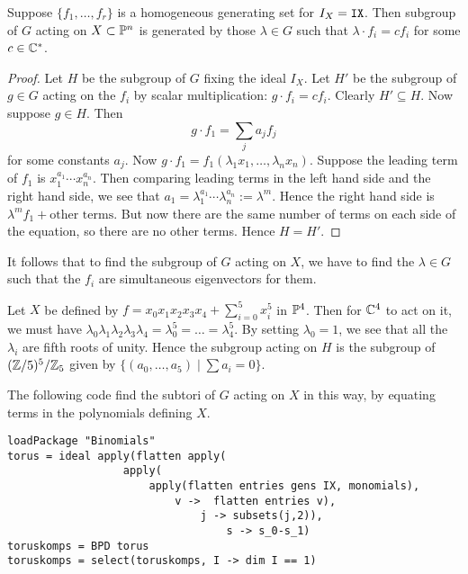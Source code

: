 \begin{lemma}
Suppose $\{ f_1,\ldots, f_r \}$ is a homogeneous generating set for $I_X=\text{\texttt{IX}}$. Then subgroup of $G$ acting on $X \subset \P^n$ is generated by those $\lambda \in G$ such that $\lambda \cdot f_i  = c f_i$ for some $c \in \C^\ast$.
\end{lemma}
\begin{proof}
Let $H$ be the subgroup of $G$ fixing the ideal $I_X$. Let $H'$ be the subgroup of $g \in G$ acting on the $f_i$ by scalar multiplication: $g \cdot f_i =c f_i$. Clearly $H' \subseteq H$.  Now suppose $g \in H$. Then
$$
g \cdot f_1 = \sum_j a_j f_j
$$
for some constants $a_j$. Now $g \cdot f_1 = f_1(\lambda_1 x _1 ,\ldots, \lambda_n x_n)$. Suppose the leading term of $f_1$ is $x_1^{a_1}\cdots x_n^{a_n}$. Then comparing leading terms in the left hand side and the right hand side, we see that $a_1 = \lambda_1^{a_1}\cdots \lambda_n^{a_n} := \lambda^m$. Hence the right hand side is $\lambda^m f_1 + \text{other terms}$. But now there are the same number of terms on each side of the equation, so there are no other terms. Hence $H=H'$. 
\end{proof}

It follows that to find the subgroup of $G$ acting on $X$, we have to find the $\lambda \in G$ such that the $f_i$ are simultaneous eigenvectors for them.

\begin{example}
\label{example:torus}
Let  $X$ be defined by $f = x_0x_1x_2x_3x_4+\sum_{i=0}^5 x_i^5$ in $\P^4$. Then for $\C^4$ to act on it, we must have $\lambda_0\lambda_1\lambda_2\lambda_3\lambda_4=\lambda_0^5=\ldots=\lambda_4^5$. By setting $\lambda_0=1$, we see that all the $\lambda_i$ are fifth roots of unity. Hence the subgroup acting on $H$ is the subgroup of $(\Z/5)^5/\Z_5$ given by $\{ (a_0,\ldots,a_5) \mid \sum a_i = 0 \}$.
\end{example}

The following code find the subtori of $G$ acting on $X$ in this way, by equating terms in the polynomials defining $X$.

\begin{lstlisting}[language=Macaulay2]
loadPackage "Binomials"
torus = ideal apply(flatten apply(
                  apply(
                      apply(flatten entries gens IX, monomials),
                          v ->  flatten entries v), 
                              j -> subsets(j,2)),
                                  s -> s_0-s_1)
toruskomps = BPD torus
toruskomps = select(toruskomps, I -> dim I == 1)
\end{lstlisting}

